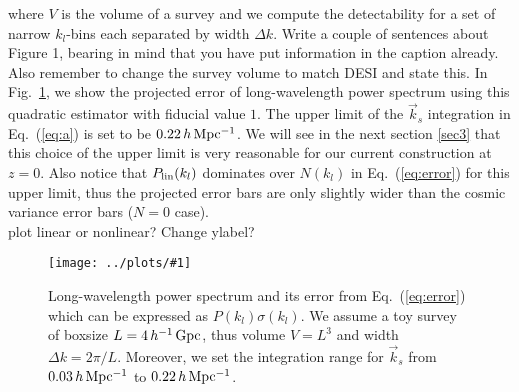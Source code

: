 \documentclass[prd,amsmath,amssymb,floatfix,superscriptaddress,nofootinbib,twocolumn]{revtex4-1}
\newcommand{\vk}{\vec{k}}
\newcommand{\ec}[1]{Eq.~(\ref{eq:#1})}
\newcommand{\rf}[1]{\ref{fig:#1}}
\newcommand{\sfig}[2]{
\texttt{[image: ../plots/\#1]}
        }
\newcommand{\Sfig}[2]{
   \begin{figure}[thbp]
   \begin{center}
    \sfig{../plots/#1.pdf}{\columnwidth}
    \caption{{\small #2}}
    \label{fig:#1}
     \end{center}
   \end{figure}
}
\newcommand{\peikai}[1]{{\color{blue} #1}}
\newcommand{\RC}[1]{{\color{darkorange} #1}}
\begin{document}
where $V$ is the volume of a survey and we compute the detectability for a set of narrow $k_l$-bins each separated by width $\Delta k$.\RC{ Write a couple of sentences about Figure 1, bearing in mind that you have put information in the caption already. Also remember to change the survey volume to match DESI and state this.} \peikai{In Fig.~\rf{SN}, we show the projected error of long-wavelength power spectrum using this quadratic estimator with fiducial value $1$. The upper limit of the $\vk_s$ integration in \ec{a} is set to be $0.22\,h\,\rm Mpc^{-1}$. We will see in the next section \ref{sec3} that this choice of the upper limit is very reasonable for our current construction at $z=0$. Also notice that $P_{\rm lin}(k_l)$ dominates over $N(k_l)$ in \ec{error} for this upper limit, thus the projected error bars are only slightly wider than the cosmic variance error bars ($N=0$ case).}\\
\peikai{plot linear or nonlinear? Change ylabel?}
\Sfig{SN}{Long-wavelength power spectrum and its error from \ec{error} which can be expressed as $P(k_l)\sigma(k_l)$. We assume a toy survey of boxsize $L=4\, h^{-1}\rm\, Gpc$, thus volume $V=L^3$ and width $\Delta k = 2\pi/L$. Moreover, we set the integration range for $\vk_s$ from $0.03 \,h \,\rm Mpc^{-1}$ to $0.22\,h\,\rm Mpc^{-1}$.}
\end{document}
